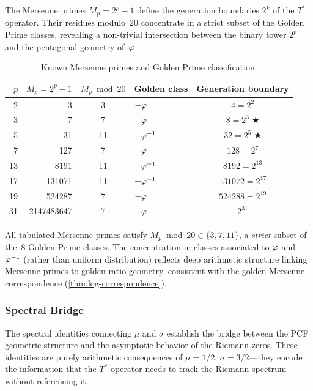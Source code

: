 The Mersenne primes $M_p=2^p-1$ define the generation boundaries $2^k$ of
the $T^*$ operator.  Their residues modulo~$20$ concentrate in a strict
subset of the Golden Prime classes, revealing a non-trivial intersection
between the binary tower $2^p$ and the pentagonal geometry of~$\varphi$.

\begin{table}[ht]
\centering
\caption{Known Mersenne primes and Golden Prime classification.}
\label{tab:mersenne-golden}
\begin{tabular}{rrclc}
\toprule
$p$ & $M_p = 2^p-1$ & $M_p\bmod 20$ & Golden class & Generation boundary \\
\midrule
2  & 3            & 3  & $-\varphi$       & $4 = 2^2$ \\
3  & 7            & 7  & $-\varphi$       & $8 = 2^3\;\bigstar$ \\
5  & 31           & 11 & $+\varphi^{-1}$  & $32 = 2^5\;\bigstar$ \\
7  & 127          & 7  & $-\varphi$       & $128 = 2^7$ \\
13 & 8191         & 11 & $+\varphi^{-1}$  & $8192 = 2^{13}$ \\
17 & 131071       & 11 & $+\varphi^{-1}$  & $131072 = 2^{17}$ \\
19 & 524287       & 7  & $-\varphi$       & $524288 = 2^{19}$ \\
31 & 2147483647   & 7  & $-\varphi$       & $2^{31}$ \\
\bottomrule
\end{tabular}
\end{table}

\begin{Remark}\label{rmk:mersenne-concentration}
All tabulated Mersenne primes satisfy $M_p\bmod 20\in\{3,7,11\}$, a
\emph{strict} subset of the~$8$ Golden Prime classes. The concentration
in classes associated to $\varphi$ and $\varphi^{-1}$ (rather than
uniform distribution) reflects deep arithmetic structure linking Mersenne
primes to golden ratio geometry, consistent with the golden-Mersenne
correspondence (\cref{thm:log-correspondence}).
\end{Remark}

\subsubsection{Spectral Bridge}

The spectral identities connecting $\mu$ and $\sigma$ establish the
bridge between the PCF geometric structure and the asymptotic behavior of
the Riemann zeros.  These identities are purely arithmetic consequences of
$\mu=1/2$, $\sigma=3/2$---they encode the information that the $T^*$
operator needs to track the Riemann spectrum without referencing it.

